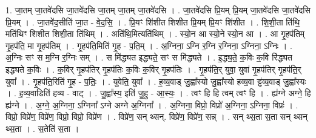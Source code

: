 \documentclass[17pt]{extarticle}
\begin{document}
1. जा॒तम् जा॒तवे॑दसि जा॒तवे॑दसि जा॒तम् जा॒तम् जा॒तवे॑दसि । . जा॒तवे॑दसि प्रि॒यम् प्रि॒यम् जा॒तवे॑दसि जा॒तवे॑दसि प्रि॒यम् । . जा॒तवे॑द॒सीति॑ जा॒त - वे॒द॒सि॒ । . प्रि॒यꣳ शि॑शीत शिशीत प्रि॒यम् प्रि॒यꣳ शि॑शीत । . शि॒शी॒ता ति॑थि॒ मति॑थिꣳ शिशीत शिशी॒ता ति॑थिम् । . अति॑थि॒मित्यति॑थिम् । . स्यो॒न आ स्यो॒ने स्यो॒न आ । . आ गृ॒हप॑तिम् गृ॒हप॑ति॒ मा गृ॒हप॑तिम् । . गृ॒हप॑ति॒मिति॑ गृ॒ह - प॒ति॒म् । . अ॒ग्निना॒ ऽग्नि र॒ग्नि र॒ग्निना॒ ऽग्निना॒ ऽग्निः । . अ॒ग्निः सꣳ स म॒ग्नि र॒ग्निः सम् । . स मि॑द्ध्यत इद्ध्यते॒ सꣳ स मि॑द्ध्यते । . इ॒द्ध्य॒ते॒ क॒विः क॒वि रि॑द्ध्यत इद्ध्यते क॒विः । . क॒विर् गृ॒हप॑तिर् गृ॒हप॑तिः क॒विः क॒विर् गृ॒हप॑तिः । . गृ॒हप॑ति॒र् युवा॒ युवा॑ गृ॒हप॑तिर् गृ॒हप॑ति॒र् युवा᳚ । . गृ॒हप॑ति॒रिति॑ गृ॒ह - प॒तिः॒ । . युवेति॒ युवा᳚ । . ह॒व्य॒वाड् जु॒ह्वा᳚स्यो जु॒ह्वा᳚स्यो हव्य॒वा ड्ढ॑व्य॒वाड् जु॒ह्वा᳚स्यः । . ह॒व्य॒वाडिति॑ हव्य - वाट् । . जु॒ह्वा᳚स्य॒ इति॑ जु॒हु - आ॒स्यः॒ । . त्वꣳ हि हि त्वम् त्वꣳ हि । . ह्य॑ग्ने अग्ने॒ हि ह्य॑ग्ने । . अ॒ग्ने॒ अ॒ग्निना॒ ऽग्निना᳚ ऽग्ने अग्ने अ॒ग्निना᳚ । . अ॒ग्निना॒ विप्रो॒ विप्रो॑ अ॒ग्निना॒ ऽग्निना॒ विप्रः॑ । . विप्रो॒ विप्रे॑ण॒ विप्रे॑ण॒ विप्रो॒ विप्रो॒ विप्रे॑ण । . विप्रे॑ण॒ सन् थ्सन्. विप्रे॑ण॒ विप्रे॑ण॒ सन्न् । . सन् थ्स॒ता स॒ता सन् थ्सन् थ्स॒ता । . स॒तेति॑ स॒ता । \newline
\end{document}

